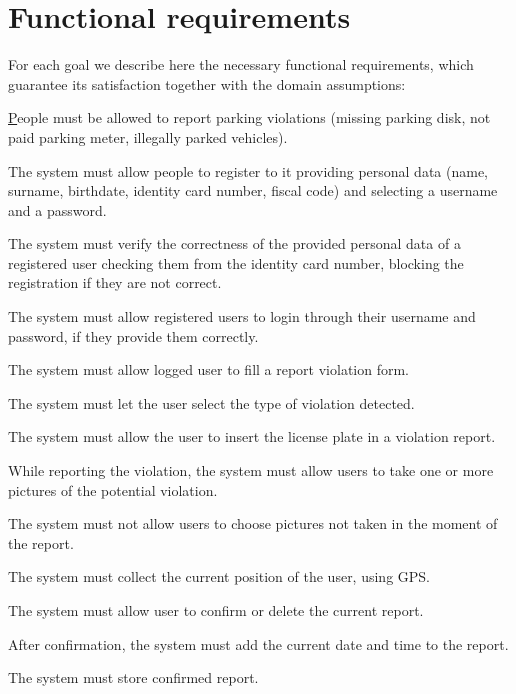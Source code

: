 \documentclass[a4paper]{report}
\begin{document}
\section{Functional requirements}
\label{sec:fun-requirements} 
For each goal we describe here the necessary functional requirements, which guarantee its satisfaction together with the domain assumptions:
\begin{enumerate}[start=1,label={[G\arabic*]}]
\item \hyperref[G1]People must be allowed to report parking violations (missing parking disk, not paid parking meter, illegally parked vehicles).
\begin{enumerate}[start=1,label={[R\arabic*]}]
\item \label{R1}The system must allow people to register to it providing personal data (name, surname, birthdate, identity card number, fiscal code) and selecting a username and a password.
\item \label{R2}The system must verify the correctness of the provided personal data of a registered user checking them from the identity card number, blocking the registration if they are not correct.
\item \label{R3}The system must allow registered users to login through their username and password, if they provide them correctly. 
\item \label{R4}The system must allow logged user to fill a report violation form.
\item \label{R5}The system must let the user select the type of violation detected.
\item \label{R6}The system must allow the user to insert the license plate in a violation report.
\item \label{R7}While reporting the violation, the system must allow users to take one or more pictures of the potential violation.
\item \label{R8}The system must not allow users to choose pictures not taken in the moment of the report.
\item \label{R9}The system must collect the current position of the user, using GPS.
\item \label{R10}The system must allow user to confirm or delete the current report.
\item	\label{R11}After confirmation, the system must add the current date and time to the report.
\item \label{R12}The system must store confirmed report.
\end{enumerate}

\end{enumerate}
\end{document}

